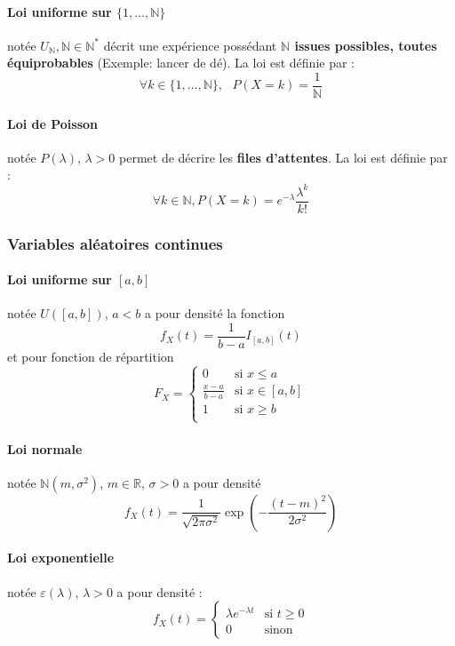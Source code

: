 \documentclass[10pt,a4paper,twoside]{article}
\begin{document}
\paragraph{Loi uniforme sur $\{1,\ldots,\mathbb{N}\}$} notée $U_{\mathbb{N}}, \mathbb{N}\in \mathbb{N}^{*}$ décrit une expérience possédant \textbf{$\mathbb{N}$ issues possibles, toutes équiprobables} (Exemple: lancer de dé). La loi est définie par :
$$\forall k \in \{1,\ldots,\mathbb{N}\},\ \ \ P(X=k)=\frac{1}{\mathbb{N}}$$

\paragraph{Loi de Poisson} notée $P(\lambda)$, $\lambda >0$ permet de décrire les \textbf{files d'attentes}. La loi est définie par :
$$\forall k \in \mathbb{N}, P(X=k)=e^{-\lambda}\frac{\lambda^{k}}{k!}$$


\subsubsection{Variables aléatoires continues}

\paragraph{Loi uniforme sur $[a,b]$} notée $U([a,b])$, $a<b$ a pour densité la fonction
$$f_{X}(t) = \frac{1}{b-a}I_{[a,b]}(t)$$
et pour fonction de répartition
$$F_{X}=\left\lbrace 
\begin{array}{ll}
0 & \text{si } x\leqslant a \\
\frac{x-a}{b-a} & \text{si } x\in [a,b]\\
1 & \text{si } x\geqslant b \\
\end{array}
\right.$$

\paragraph{Loi normale} notée $\mathbb{N}(m,\sigma^{2})$, $m \in \mathbb{R}$, $\sigma>0$ a pour densité
$$f_{X}(t)=\frac{1}{\sqrt{2\pi\sigma^{2}}}\exp\left(-\frac{(t-m)^{2}}{2\sigma^{2}}\right)$$

\paragraph{Loi exponentielle} notée $\varepsilon(\lambda)$, $\lambda>0$ a pour densité :
$$f_{X}(t) = \left\lbrace
\begin{array}{ll}
\lambda e^{-\lambda t} & \text{si } t \geqslant 0\\
0 & \text{sinon}
\end{array}\right.$$
\end{document}
